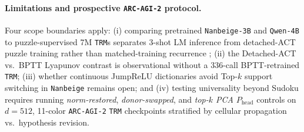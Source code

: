 \documentclass[10pt,letterpaper]{article}
\newcommand{\Phead}{P_{\mathrm{head}}}
\begin{document}
\paragraph{Limitations and prospective \texttt{ARC-AGI-2} protocol.} Four scope boundaries apply: (i) comparing pretrained \texttt{Nanbeige-3B} and \texttt{Qwen-4B} to puzzle-supervised 7M \texttt{TRM}s separates 3-shot LM inference from detached-ACT puzzle training rather than matched-training recurrence \cite{sesodia2026inside}; (ii) the Detached-ACT vs.\ BPTT Lyapunov contrast is observational without a 336-call BPTT-retrained \texttt{TRM}; (iii) whether continuous JumpReLU dictionaries avoid Top-$k$ support switching in \texttt{Nanbeige} remains open; and (iv) testing universality beyond Sudoku requires running \emph{norm-restored}, \emph{donor-swapped}, and \emph{top-$k$ PCA} $\Phead$ controls on $d=512$, 11-color \texttt{ARC-AGI-2} \texttt{TRM} checkpoints \cite{jolicoeur2025trm} stratified by cellular propagation vs.\ hypothesis revision.



\end{document}
